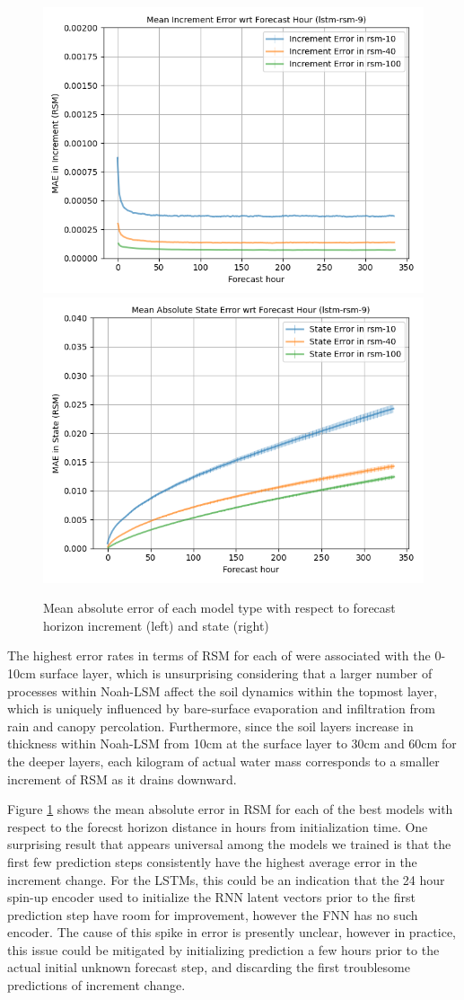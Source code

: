 \begin{figure}[hp!]
    \includegraphics[width=.42\linewidth,draft=false]{figures/horizons/eval_best-redo_lstm-rsm-9_rsm_horizon_na_res.png}
    \includegraphics[width=.42\linewidth,draft=false]{figures/horizons/eval_best-redo_lstm-rsm-9_rsm_horizon_na_state.png}


    \caption{Mean absolute error of each model type with respect to forecast horizon increment (left) and state (right)}
    \label{best-horizons}
\end{figure}

The highest error rates in terms of RSM for each of were associated with the 0-10cm surface layer, which is unsurprising considering that a larger number of processes within Noah-LSM affect the soil dynamics within the topmost layer, which is uniquely influenced by bare-surface evaporation and infiltration from rain and canopy percolation. Furthermore, since the soil layers increase in thickness within Noah-LSM from 10cm at the surface layer to 30cm and 60cm for the deeper layers, each kilogram of actual water mass corresponds to a smaller increment of RSM as it drains downward.

Figure \ref{best-horizons} shows the mean absolute error in RSM for each of the best models with respect to the forecst horizon distance in hours from initialization time. One surprising result that appears universal among the models we trained is that the first few prediction steps consistently have the highest average error in the increment change. For the LSTMs, this could be an indication that the 24 hour spin-up encoder used to initialize the RNN latent vectors prior to the first prediction step have room for improvement, however the FNN has no such encoder. The cause of this spike in error is presently unclear, however in practice, this issue could be mitigated by initializing prediction a few hours prior to the actual initial unknown forecast step, and discarding the first troublesome predictions of increment change.

